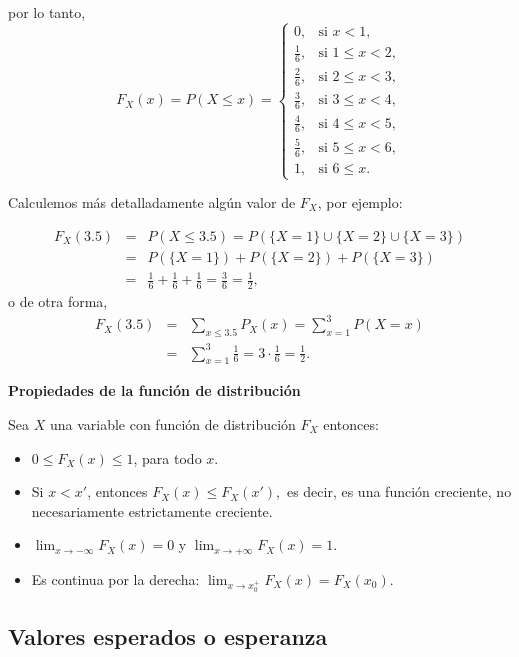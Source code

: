 \documentclass[]{book}
\providecommand{\tightlist}{%
  \setlength{\itemsep}{0pt}\setlength{\parskip}{0pt}}
\begin{document}
por lo tanto,
\[F_{X}(x)=P(X\leq x)=\left\{\begin{array}{ll}
   0, & \mbox{si } x<1,\\[1ex]
   \frac16, &\mbox{si } 1\leq x<2,\\[1ex]
   \frac26, &\mbox{si } 2\leq x<3,\\[1ex]
   \frac36, &\mbox{si } 3\leq x<4,\\[1ex]
   \frac46, &\mbox{si } 4\leq x<5,\\[1ex]
   \frac56, &\mbox{si } 5\leq x<6,\\[1ex]
   1, &\mbox{si } 6\leq x.\end{array}\right.\]

Calculemos más detalladamente algún valor de \(F_{X}\), por ejemplo:

\begin{eqnarray*}
F_{X}(3.5) & = & P(X\leq 3.5)=  P(\{X=1\}\cup\{X=2\}\cup \{X=3\})\\
&=& P(\{X=1\})+P(\{X=2\})+P(\{X=3\})\\
&=& \frac16+\frac16+\frac16=\frac36 =\frac12,
\end{eqnarray*}
o de otra forma,
\begin{eqnarray*}
F_{X}(3.5)&=&\sum_{x\leq 3.5} P_X(x)=\sum_{x=1}^3 P(X=x)\\&=&\sum_{x=1}^3 \frac16= 3 \cdot
   \frac16=\frac12.
\end{eqnarray*}

\textbf{Propiedades de la función de distribución}

Sea \(X\) una variable con función de distribución \(F_{X}\) entonces:

\begin{itemize}
\tightlist
\item
  \(0\leq F_{X}(x)\leq 1\), para todo \(x\).
\item
  Si \(x<x'\), entonces \(F_{X}(x)\leq F_{X}(x'),\) es decir, es una función creciente, no necesariamente estrictamente creciente.
\item
  \(\displaystyle \lim_{x\to -\infty}F_{X}(x)=0\) y \(\displaystyle \lim_{x\to +\infty}F_{X}(x)=1\).
\item
  Es continua por la derecha: \(\displaystyle \lim_{x\to x_0^{+}}F_{X}(x)=F_{X}(x_0)\).
\end{itemize}

\hypertarget{valores-esperados-o-esperanza}{%
\subsection{Valores esperados o esperanza}\label{valores-esperados-o-esperanza}}
\end{document}
